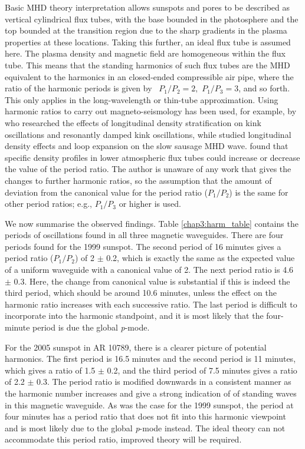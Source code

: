 	Basic MHD theory interpretation allows sunspots and pores to be described as vertical cylindrical flux tubes, with the base bounded in the photosphere and the top bounded at the transition region due to the sharp gradients in the plasma properties at these locations.
	Taking this further, an ideal flux tube is assumed here.
	The plasma density and magnetic field are homogeneous within the flux tube.
	This means that the standing harmonics of such flux tubes are the MHD equivalent to the harmonics in an closed-ended compressible air pipe, where the ratio of the harmonic periods is given by \, $P_{1}/P_{2}=2, \,\, P_{1}/P_{3}=3$, and so forth.
	This only applies in the long-wavelength or thin-tube approximation.
	Using harmonic ratios to carry out magneto-seismology has been used, for example, by \citet{2005ApJ...624L..57A,2005A&A...430.1109A} who researched the effects of longitudinal density stratification on kink oscillations and resonantly damped kink oscillations, while \citet{luna-cardozo} studied longitudinal density effects and loop expansion on the slow sausage MHD wave.
	\citet{luna-cardozo} found that specific density profiles in lower atmospheric flux tubes could increase or decrease the value of the period ratio.
	The author is unaware of any work that gives the changes to further harmonic ratios, so the assumption that the amount of deviation from the canonical value for the period ratio ($P_{1}/P_{2}$) is the same for other period ratios; e.g., $P_{1}/P_{3}$ or higher is used.
	
	We now summarise the observed findings. Table \ref{chap3:harm_table} contains the periods of oscillations found in all three magnetic waveguides.
	There are four periods found for the 1999 sunspot.
	The second period of 16 minutes gives a period ratio ($P_{1}/P_{2}$) of 2 $\pm$ 0.2, which is exactly the same as the expected value of a uniform waveguide with a canonical value of 2.
	The next period ratio is 4.6 $\pm$ 0.3.
	Here, the change from canonical value is substantial if this is indeed the third period, which should be around 10.6 minutes, unless the effect on the harmonic ratio increases with each successive ratio.
	The last period is difficult to incorporate into the harmonic standpoint, and it is most likely that the four-minute period is due the global \textit{p}-mode.
	
	For the 2005 sunspot in AR 10789, there is a clearer picture of potential harmonics.
	The first period is 16.5 minutes and the second period is 11 minutes, which gives a ratio of 1.5 $\pm$ 0.2, and the third period of 7.5 minutes gives a ratio of 2.2 $\pm$ 0.3.
	The period ratio is modified downwards in a consistent manner as the harmonic number increases and give a strong indication of of standing waves in this magnetic waveguide.
	As was the case for the 1999 sunspot, the period at four minutes has a period ratio that does not fit into this harmonic viewpoint and is most likely due to the global \textit{p}-mode instead.
	The ideal theory can not accommodate this period ratio, improved theory will be required.
	
